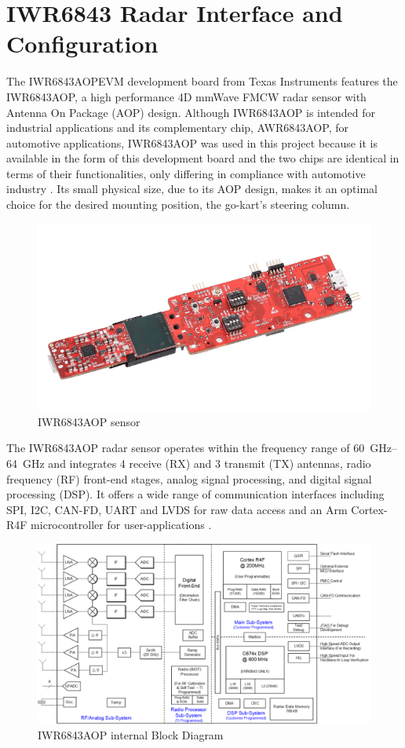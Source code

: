 \section{IWR6843 Radar Interface and Configuration}
\label{sec:IWR6843 Radar Interface and Configuration}
The IWR6843AOPEVM development board from Texas Instruments features the IWR6843AOP, a high performance 4D mmWave FMCW radar sensor with Antenna On Package (AOP) design.
Although IWR6843AOP is intended for industrial applications and its complementary chip, AWR6843AOP, for automotive applications, IWR6843AOP was used in this project because it is available in the form of this development board and the two chips are identical in terms of their functionalities, only differing in compliance with automotive  industry \cite{iwr_awr_diff}.
Its small physical size, due to its AOP design, makes it an optimal choice for the desired mounting position, the go-kart's steering column.
\begin{figure}[!htbp]
    \centering
    \includegraphics[width=0.7\linewidth]{images/iwr6843aopevm-angled.png}
    \caption{IWR6843AOP sensor}
    \label{fig:IWR6843AOP sensor}
\end{figure}
\par
The IWR6843AOP radar sensor operates within the frequency range of \SIrange{60}{64}{\giga\hertz} and integrates 4 receive (RX) and 3 transmit (TX) antennas, radio frequency (RF) front-end stages, analog signal processing, and digital signal processing (DSP).
It offers a wide range of communication interfaces including SPI, I2C, CAN-FD, UART and LVDS for raw data access and an Arm Cortex-R4F microcontroller for user-applications \cite{dev_board_page}.
\begin{figure}[!htbp]
    \centering
    \includegraphics[width=1.0\linewidth]{images/blockdiagram.png}
    \caption{IWR6843AOP internal Block Diagram}
    \label{fig:IWR6843AOP_internal}
\end{figure}
